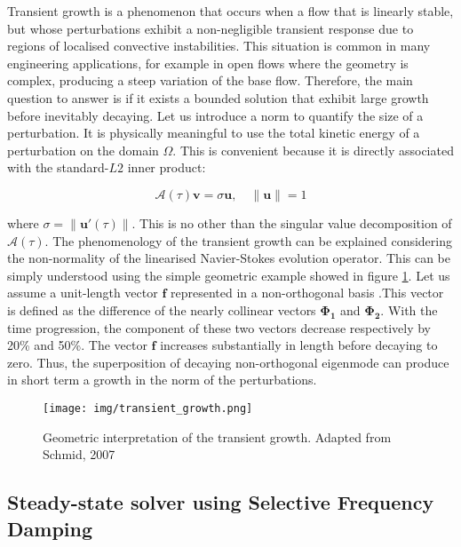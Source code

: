 Transient growth  is a phenomenon that occurs when a flow that is linearly stable, but whose perturbations exhibit a non-negligible transient response due to regions of localised convective instabilities. This situation is common in many engineering applications, for example in open flows where the geometry is complex, producing a steep variation of the base flow. Therefore, the main question to answer is if it exists a bounded solution that exhibit large growth before inevitably decaying. Let us introduce a norm to quantify the size of a perturbation. It is physically meaningful to use the total kinetic energy of a perturbation on the domain $\Omega$. This is convenient because it is directly associated with the
standard-$L2$ inner product:

\begin{equation}
\mathcal{A}(\tau)\mathbf{v}=\sigma \mathbf{u}, \quad \left\| \mathbf{u} \right\|=1
\end{equation}


where $\sigma=\left\| \mathbf{u'}(\tau)\right\|$. This is no other
than the singular value decomposition of $\mathcal{A}(\tau)$. The
phenomenology of the transient growth can be explained considering the
non-normality of the linearised Navier-Stokes evolution operator. This
can be simply understood using the simple geometric example showed in
figure \ref{TG}. Let us assume a unit-length vector $\mathbf{f}$
represented in a non-orthogonal basis .This vector is defined as the
difference of the nearly collinear vectors $\mathbf{\Phi_1}$ and
$\mathbf{\Phi_2}$.  With the time progression, the component of these
two vectors decrease respectively by 20\% and 50\%. The vector
$\mathbf{f}$ increases substantially in length before decaying to
zero. Thus, the superposition of decaying non-orthogonal eigenmode can
produce in short term a growth in the norm of the perturbations.


\begin{figure}[!htbp]
\centering
 \label{TG}
 {\texttt{[image: img/transient\_growth.png]}}
   \caption {Geometric interpretation of the transient growth. Adapted from Schmid, 2007 }
\end{figure}


\subsection{Steady-state solver using Selective Frequency Damping}
\label{SectionSFD}

